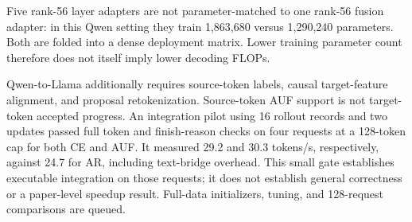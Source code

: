 \documentclass{article}
\begin{document}
Five rank-56 layer adapters are not parameter-matched to one rank-56 fusion
adapter: in this Qwen setting they train 1,863,680 versus 1,290,240 parameters.
Both are folded into a dense deployment matrix. Lower training parameter
count therefore does not itself imply lower decoding FLOPs.

Qwen-to-Llama additionally requires source-token labels, causal target-feature
alignment, and proposal retokenization. Source-token AUF support is not
target-token accepted progress. An integration pilot using 16 rollout records
and two updates passed full token and finish-reason checks on four requests
at a 128-token cap for both CE and AUF. It measured 29.2 and 30.3 tokens/s,
respectively, against 24.7 for AR, including text-bridge overhead. This small
gate establishes executable integration on those requests; it does not
establish general correctness or a paper-level speedup result. Full-data
initializers, tuning, and 128-request comparisons are queued.
\end{document}
